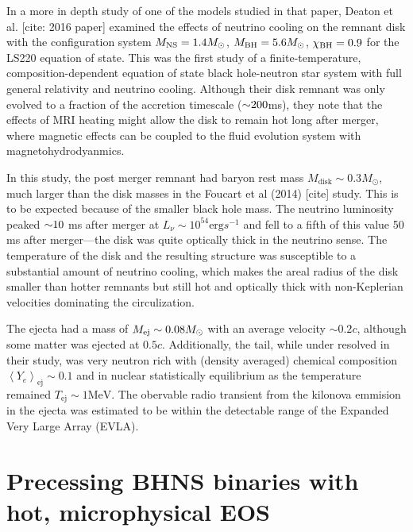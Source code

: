 In a more in depth study of one of the models studied in that paper, Deaton et al. [cite: 2016 paper] examined the effects of neutrino cooling on the remnant disk with the configuration system $M_{\rm NS} = 1.4 M_\odot$, $M_{\rm BH} = 5.6 M_\odot$, $\chi_{\rm BH} = 0.9$ for the LS220 equation of state.  
This was the first study of a finite-temperature, composition-dependent equation of state black hole-neutron star system with full general relativity and neutrino cooling.  
Although their disk remnant was only evolved to a fraction of the accretion timescale ($\mathord{\sim} 200$ms), they note that the effects of MRI heating might allow the disk to remain hot long after merger, where magnetic effects can be coupled to the fluid evolution system with magnetohydrodyanmics.


In this study, the post merger remnant had baryon rest mass $M_\textrm{disk} \sim 0.3 M_\odot$, much larger than the disk masses in the Foucart et al (2014) [cite] study.  
This is to be expected because of the smaller black hole mass.
The neutrino luminosity peaked $\mathord{\sim} 10$ ms after merger at $L_\nu \sim 10^{54} \textrm{erg} s^{-1}$ and fell to a fifth of this value 50 ms after merger---the disk was quite optically thick in the neutrino sense.  The temperature of the disk and the resulting structure was susceptible to a substantial amount of neutrino cooling, which makes the areal radius of the disk smaller than hotter remnants but still hot and optically thick with non-Keplerian velocities dominating the circulization.

The ejecta had a mass of $M_{\rm ej} \sim 0.08 M_\odot$ with an average velocity $\sim 0.2 c$, although some matter was ejected at $0.5 c$. Additionally, the tail, while under resolved in their study, was very neutron rich with (density averaged) chemical composition $\left\langle Y_e \right\rangle_\textrm{ej} \sim 0.1$  and in nuclear statistically equilibrium as the temperature remained $T_\textrm{ej} \sim 1 \textrm{MeV}$.  The obervable radio transient from the kilonova emmision in the ejecta was estimated to be within the detectable range of the Expanded Very Large Array (EVLA).


\section{Precessing BHNS binaries with hot, microphysical EOS}

